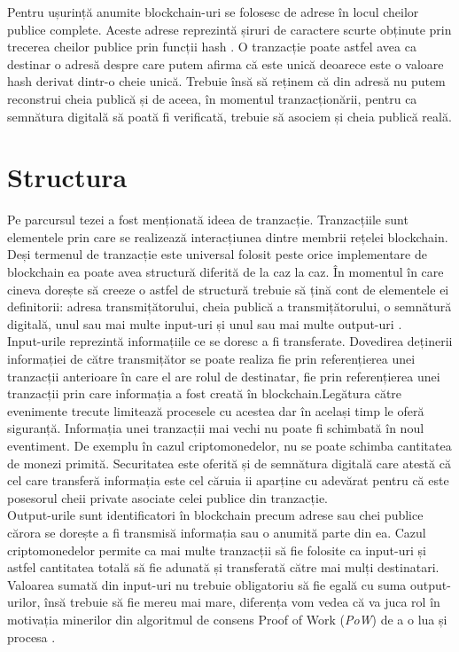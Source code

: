 Pentru ușurință anumite blockchain-uri se folosesc de adrese în locul cheilor publice complete. Aceste adrese reprezintă șiruri de caractere scurte obținute prin trecerea cheilor publice prin funcții hash \cite{Blockchain_Overview_NIST}. O tranzacție poate astfel avea ca destinar o adresă despre care putem afirma că este unică deoarece este o valoare hash derivat dintr-o cheie unică. Trebuie însă să reținem că din adresă nu putem reconstrui cheia publică și de aceea, în momentul tranzacționării, pentru ca semnătura digitală să poată fi verificată, trebuie să asociem și cheia publică reală.\\ 

\clearpage

\section{Structura}

Pe parcursul tezei a fost menționată ideea de tranzacție. Tranzacțiile sunt elementele prin care se realizează interacțiunea dintre membrii rețelei blockchain.\\

Deși termenul de tranzacție este universal folosit peste orice implementare de blockchain ea poate avea structură diferită de la caz la caz. În momentul în care cineva dorește să creeze o astfel de structură trebuie să țină cont de elementele ei definitorii: adresa transmițătorului, cheia publică a transmițătorului, o semnătură digitală, unul sau mai multe input-uri și unul sau mai multe output-uri \cite{Blockchain_Overview_NIST}.\\

Input-urile reprezintă informațiile ce se doresc a fi transferate. Dovedirea deținerii informației de către transmițător se poate realiza fie prin referențierea unei tranzacții anterioare în care el are rolul de destinatar, fie prin referențierea unei tranzacții prin care informația a fost creată în blockchain.Legătura către evenimente trecute limitează procesele cu acestea dar în același timp le oferă siguranță. Informația unei tranzacții mai vechi nu poate fi schimbată în noul eventiment. De exemplu în cazul criptomonedelor, nu se poate schimba cantitatea de monezi primită. Securitatea este oferită și de semnătura digitală care atestă că cel care transferă informația este cel căruia ii aparține cu adevărat pentru că este posesorul cheii private asociate celei publice din tranzacție.\\

Output-urile sunt identificatori în blockchain precum adrese sau chei publice cărora se dorește a fi transmisă informația sau o anumită parte din ea. Cazul criptomonedelor permite ca mai multe tranzacții să fie folosite ca input-uri și astfel cantitatea totală să fie adunată și transferată către mai mulți destinatari. Valoarea sumată din input-uri nu trebuie obligatoriu să fie egală cu suma output-urilor, însă trebuie să fie mereu mai mare, diferența vom vedea că va juca rol în motivația minerilor din algoritmul de consens Proof of Work (\textit{PoW}) de a o lua și procesa \cite{Blockchain_Overview_IEEE}.\\

